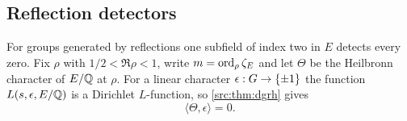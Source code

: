 \subsection{Reflection detectors}\label{nab:sec:reflection}
\begingroup\raggedright
{}
\endgroup

For groups generated by reflections one subfield of index two in $E$ detects every zero.
Fix $\rho$ with $1/2<\Re\rho<1$, write $m=\operatorname{ord}_\rho\zeta_E$ and let $\Theta$ be the
Heilbronn character of $E/\mathbb{Q}$ at $\rho$. For a linear character $\epsilon:G\to\{\pm1\}$
the function $L(s,\epsilon,E/\mathbb{Q})$ is a Dirichlet $L$-function, so \cref{src:thm:dgrh} gives
\begin{equation}\label{nab:eq:signorth}
 \langle\Theta,\epsilon\rangle=0 .
\end{equation}


